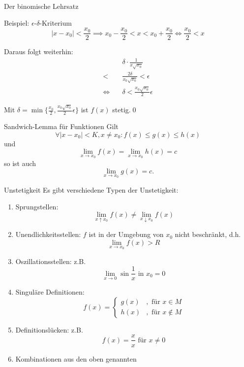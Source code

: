\documentclass[german]{spicker}
\renewcommand{\abs}[1]{\left| #1 \right|}
\begin{document}
\begin{defi}{Der binomische Lehrsatz}
\begin{bonus}{Beispiel: $\epsilon$-$\delta$-Kriterium}
    $$\abs{x-x_0} < \frac{x_0}{2} \implies x_0 -\frac{x_0}{2}  < x < x_0 + \frac{x_0}{2}  \iff \frac{x_0}{2} < x$$

    Daraus folgt weiterhin:
    $$
        \begin{aligned}
                       & \delta \cdot \frac{1 }{ x\sqrt{x_0} }       \\
            < \quad    & \frac{2\delta }{ x_0\sqrt{x_0} } < \epsilon \\
            \iff \quad & \delta < \frac{x_0\sqrt{x_0}}{2} \epsilon
        \end{aligned}
    $$

    Mit $\delta = \min\{\frac{x_0}{2}, \frac{x_0\sqrt{x_0}}{2}\epsilon\}$ ist $f(x)$ stetig.\qed
\end{bonus}

\begin{defi}{Sandwich-Lemma für Funktionen}
    Gilt
    $$
        \forall \abs{x-x_0} < K, x\neq x_0 : f(x) \leq g(x) \leq h(x)
    $$
    und
    $$
        \lim_{x\to x_0} f(x) = \lim_{x\to x_0} h(x) = c
    $$
    so ist auch
    $$
        \lim_{x\to x_0} g(x) = c.
    $$
\end{defi}

\begin{defi}{Unstetigkeit}
    Es gibt verschiedene Typen der Unstetigkeit:
    \begin{enumerate}
        \item Sprungstellen:
              $$
                  \lim_{x\uparrow x_0} f(x) \neq\lim_{x\downarrow x_0} f(x)
              $$
        \item Unendlichkeitsstellen: $f$ ist in der Umgebung von $x_0$ nicht beschränkt, d.h.
              $$
                  \lim_{x\to x_0} f(x) > R
              $$
        \item Oszillationsstellen: z.B.
              $$
                  \lim_{x\to 0} \sin \frac{1}{x} \text{ in } x_0 = 0
              $$
        \item Singuläre Definitionen:
              $$
                  f(x) = \begin{cases}
                      g(x) & , \text{ für } x \in M    \\
                      h(x) & , \text{ für } x \notin M
                  \end{cases}
              $$
        \item Definitionslücken: z.B.
              $$
                  f(x) = \frac{x}{x} \text{ für } x \neq 0
              $$
        \item Kombinationen aus den oben genannten
    \end{enumerate}
\end{defi}


\end{defi}
\end{document}
